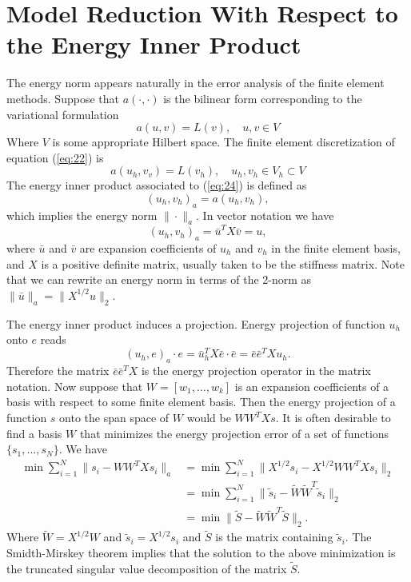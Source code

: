 \documentclass[12pt]{article}
\begin{document}
\section{Model Reduction With Respect to the Energy Inner Product}

The energy norm appears naturally in the error analysis of the finite element methods. Suppose that $a(\cdot,\cdot)$ is the bilinear form corresponding to the variational formulation
\begin{equation} \label{eq:22}
	a(u,v) = L(v), \quad u,v \in V
\end{equation}
Where $V$ is some appropriate Hilbert space. The finite element discretization of equation (\ref{eq:22}) is
\begin{equation} \label{eq:23}
	a(u_h,v_v) = L(v_h), \quad u_h,v_h\in V_h \subset V
\end{equation}
The energy inner product associated to (\ref{eq:24}) is defined as
\begin{equation} \label{eq:24}
	(u_h,v_h)_a = a(u_h,v_h),
\end{equation}
which implies the energy norm $\| \cdot \|_a$. In vector notation we have
\begin{equation} \label{eq:25}
	(u_h,v_h)_a = \bar u^T X \bar v = u,
\end{equation} 
where $\bar u$ and $\bar v$ are expansion coefficients of $u_h$ and $v_h$ in the finite element basis, and $X$ is a positive definite matrix, usually taken to be the stiffness matrix. Note that we can rewrite an energy norm in terms of the 2-norm as $\| \bar u \|_a = \| X^{1/2} u \|_2$.

The energy inner product induces a projection. Energy projection of function $u_h$ onto $e$ reads
\begin{equation} \label{eq:26}
	(u_h,e)_a \cdot e = \bar u_h^T X \bar e \cdot \bar e = \bar e \bar e^T X u_h. 
\end{equation}
Therefore the matrix $\bar e\bar e^T X$ is the energy projection operator in the matrix notation. Now suppose that $W = [ w_1,\dots,w_k ]$ is an expansion coefficients of a basis with respect to some finite element basis. Then the energy projection of a function $s$ onto the span space of $W$ would be $WW^TXs$. It is often desirable to find a basis $W$ that minimizes the energy projection error of a set of functions $\{s_1,\dots,s_N\}$. We have
\begin{equation} \label{eq:27}
\begin{aligned}
	\min \sum_{i=1}^N \| s_i - WW^TXs_i \|_a &= \min \sum_{i=1}^N \| X^{1/2} s_i - X^{1/2 }WW^TXs_i \|_2 \\
	&= \min \sum_{i=1}^N \| \tilde s_i - \tilde W \tilde W^T\tilde s_i \|_2 \\
	&= \min \| \tilde S - \tilde W \tilde W^T \tilde S \|_2.
\end{aligned}
\end{equation}
Where $\tilde W = X^{1/2} W$ and $\tilde s_i = X^{1/2} s_i$ and $\tilde S$ is the matrix containing $\tilde s_i$. The Smidth-Mirskey theorem implies that the solution to the above minimization is the truncated singular value decomposition of the matrix $\tilde S$.
\end{document}
